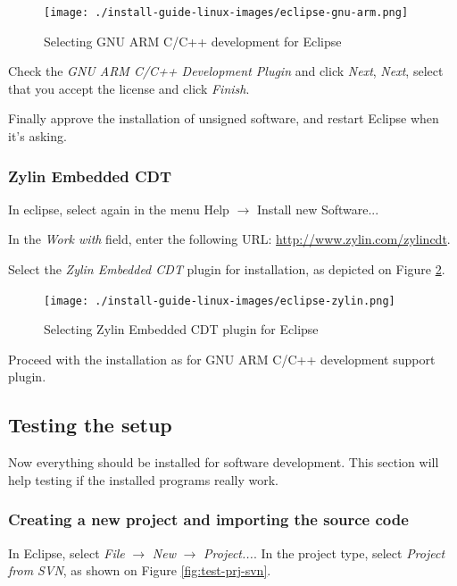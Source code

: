 \documentclass[a4paper, 10pt]{article}
\begin{document}
    \begin{figure}[H]
    \centering
        \texttt{[image: ./install-guide-linux-images/eclipse-gnu-arm.png]}
        \caption{Selecting GNU ARM C/C++ development for Eclipse}
        \label{fig:eclipse-gnu-arm}
    \end{figure}

Check the \emph{GNU ARM C/C++ Development Plugin} and click \emph{Next},
\emph{Next}, select that you accept the license and click \emph{Finish}.

Finally approve the installation of unsigned software,
and restart Eclipse when it's asking.

\subsubsection{Zylin Embedded CDT}

In eclipse, select again in the menu Help $\rightarrow$ Install new Software...

In the \emph{Work with} field, enter the following URL:
\url{http://www.zylin.com/zylincdt}.

Select the \emph{Zylin Embedded CDT} plugin for installation,
as depicted on Figure \ref{fig:eclipse-zylin}.

    \begin{figure}[H]
    \centering
        \texttt{[image: ./install-guide-linux-images/eclipse-zylin.png]}
        \caption{Selecting Zylin Embedded CDT plugin for Eclipse}
        \label{fig:eclipse-zylin}
    \end{figure}

Proceed with the installation as for GNU ARM C/C++ development support plugin.


\subsection{Testing the setup}

Now everything should be installed for software development.
This section will help testing if the installed programs really work.

\subsubsection{Creating a new project and importing the source code}

In Eclipse, select \emph{File} $\rightarrow$ \emph{New} $\rightarrow$ \emph{Project...}.
In the project type, select \emph{Project from SVN}, as shown on
Figure \ref{fig:test-prj-svn}.
\end{document}
